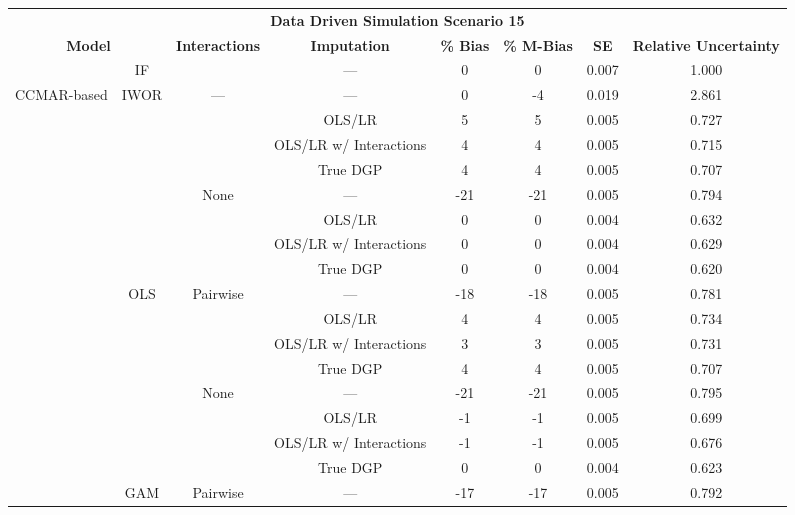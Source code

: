 \begin{table}
\centering
\begin{tabular}[ht]{|>{}c|c|c|c|c|c|c|>{}c|}
\hline
\multicolumn{8}{|c|}{\textbf{Data Driven Simulation Scenario 15}} \\
\cline{1-8}
\multicolumn{2}{|c|}{\textbf{Model}} & \textbf{Interactions} & \textbf{Imputation} & \textbf{\% Bias} & \textbf{\% M-Bias} & \textbf{SE} & \textbf{Relative Uncertainty}\\
\hline
 & IF &  & --- & 0 & 0 & 0.007 & 1.000\\
\cline{2-2}
\cline{4-8}
\multirow{-2}{*}{\centering\arraybackslash CCMAR-based} & IWOR & \multirow{-2}{*}{\centering\arraybackslash ---} & --- & 0 & -4 & 0.019 & 2.861\\
\cline{1-8}
 &  &  & OLS/LR & 5 & 5 & 0.005 & 0.727\\
\cline{4-8}
 &  &  & OLS/LR w/ Interactions & 4 & 4 & 0.005 & 0.715\\
\cline{4-8}
 &  &  & True DGP & 4 & 4 & 0.005 & 0.707\\
\cline{4-8}
 &  & \multirow{-4}{*}{\centering\arraybackslash None} & --- & -21 & -21 & 0.005 & 0.794\\
\cline{3-8}
 &  &  & OLS/LR & 0 & 0 & 0.004 & 0.632\\
\cline{4-8}
 &  &  & OLS/LR w/ Interactions & 0 & 0 & 0.004 & 0.629\\
\cline{4-8}
 &  &  & True DGP & 0 & 0 & 0.004 & 0.620\\
\cline{4-8}
 & \multirow{-8}{*}{\centering\arraybackslash OLS} & \multirow{-4}{*}{\centering\arraybackslash Pairwise} & --- & -18 & -18 & 0.005 & 0.781\\
\cline{2-8}
 &  &  & OLS/LR & 4 & 4 & 0.005 & 0.734\\
\cline{4-8}
 &  &  & OLS/LR w/ Interactions & 3 & 3 & 0.005 & 0.731\\
\cline{4-8}
 &  &  & True DGP & 4 & 4 & 0.005 & 0.707\\
\cline{4-8}
 &  & \multirow{-4}{*}{\centering\arraybackslash None} & --- & -21 & -21 & 0.005 & 0.795\\
\cline{3-8}
 &  &  & OLS/LR & -1 & -1 & 0.005 & 0.699\\
\cline{4-8}
 &  &  & OLS/LR w/ Interactions & -1 & -1 & 0.005 & 0.676\\
\cline{4-8}
 &  &  & True DGP & 0 & 0 & 0.004 & 0.623\\
\cline{4-8}
 & \multirow{-8}{*}{\centering\arraybackslash GAM} & \multirow{-4}{*}{\centering\arraybackslash Pairwise} & --- & -17 & -17 & 0.005 & 0.792\\

\end{tabular}
\end{table}
